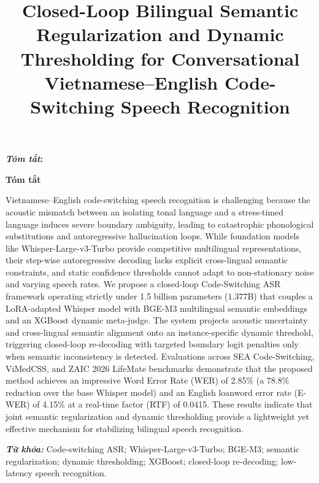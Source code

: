 \documentclass[9pt, conference, a4paper, compsocconf]{IEEEtran}
\makeatletter
\renewenvironment{abstract}
  {\normalfont
   \@IEEEabskeysecsize
   \setlength{\parindent}{0pt}
   \noindent
   \if@twocolumn
     \bfseries\textit{\abstractname}: 
   \else
     \begin{center}\textbf{\abstractname}\end{center}
   \fi}
  {\par}
\renewenvironment{IEEEkeywords}
  {\normalfont
   \@IEEEabskeysecsize
   \vspace{0.3em}       
   \setlength{\parindent}{0pt}
   \noindent
   {\bfseries\itshape \IEEEkeywordsname: }\ignorespaces}
  {\par}
\renewcommand{\abstractname}{Tóm tắt}
\renewcommand{\IEEEkeywordsname}{Từ khóa}
\makeatother
\begin{document}
\fontsize{9}{10}
\selectfont


\title{Closed-Loop Bilingual Semantic Regularization and Dynamic Thresholding for Conversational Vietnamese–English Code-Switching Speech Recognition}

\maketitle

\begin{abstract}
Vietnamese--English code-switching speech recognition is challenging because the acoustic mismatch between an isolating tonal language and a stress-timed language induces severe boundary ambiguity, leading to catastrophic phonological substitutions and autoregressive hallucination loops. While foundation models like Whisper-Large-v3-Turbo provide competitive multilingual representations, their step-wise autoregressive decoding lacks explicit cross-lingual semantic constraints, and static confidence thresholds cannot adapt to non-stationary noise and varying speech rates. We propose a closed-loop Code-Switching ASR framework operating strictly under 1.5 billion parameters ($1.377$B) that couples a LoRA-adapted Whisper model with BGE-M3 multilingual semantic embeddings and an XGBoost dynamic meta-judge. The system projects acoustic uncertainty and cross-lingual semantic alignment onto an instance-specific dynamic threshold, triggering closed-loop re-decoding with targeted boundary logit penalties only when semantic inconsistency is detected. Evaluations across SEA Code-Switching, ViMedCSS, and ZAIC 2026 LifeMate benchmarks demonstrate that the proposed method achieves an impressive Word Error Rate (WER) of 2.85\% (a 78.8\% reduction over the base Whisper model) and an English loanword error rate (E-WER) of 4.15\% at a real-time factor (RTF) of 0.0415. These results indicate that joint semantic regularization and dynamic thresholding provide a lightweight yet effective mechanism for stabilizing bilingual speech recognition.
\end{abstract}

\begin{IEEEkeywords}
Code-switching ASR; Whisper-Large-v3-Turbo; BGE-M3; semantic regularization; dynamic thresholding; XGBoost; closed-loop re-decoding; low-latency speech recognition.
\end{IEEEkeywords}
\end{document}
